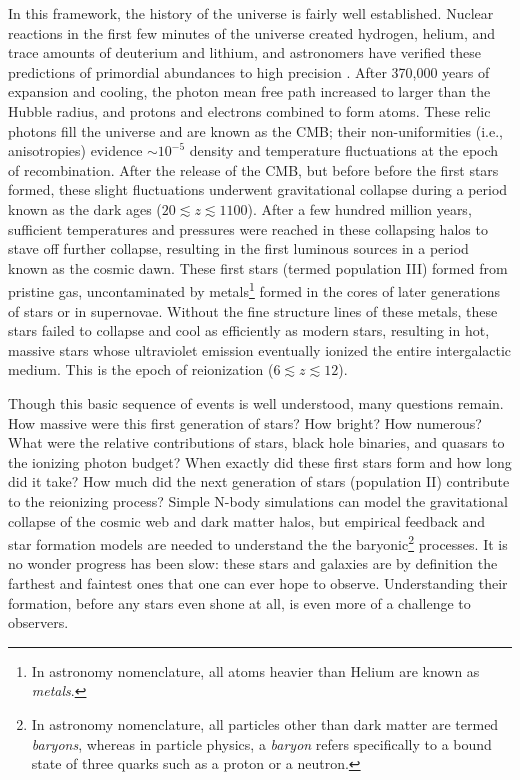 In this framework, the history of the universe is fairly well established. Nuclear reactions in the first few minutes of the universe created hydrogen, helium, and trace amounts of deuterium and lithium, and astronomers have verified these predictions of primordial abundances to high precision \citep{bbn}. After 370,000 years of expansion and cooling, the photon mean free path increased to larger than the Hubble radius, and protons and electrons combined to form atoms. These relic photons fill the universe and are known as the CMB; their non-uniformities (i.e., anisotropies) evidence $\sim10^{-5}$ density and temperature fluctuations at the epoch of recombination. After the release of the CMB, but before before the first stars formed, these slight fluctuations underwent gravitational collapse during a period known as the dark ages ($20\lesssim z\lesssim 1100$). After a few hundred million years, sufficient temperatures and pressures were reached in these collapsing halos to stave off further collapse, resulting in the first luminous sources in a period known as the cosmic dawn. These first stars (termed population III) formed from pristine gas, uncontaminated by metals\footnote{In astronomy nomenclature, all atoms heavier than Helium are known as \textit{metals}.} formed in the cores of later generations of stars or in supernovae. Without the fine structure lines of these metals, these stars failed to collapse and cool as efficiently as modern stars, resulting in hot, massive stars whose ultraviolet emission eventually ionized the entire intergalactic medium. This is the epoch of reionization ($6\lesssim z\lesssim12$).

Though this basic sequence of events is well understood, many questions remain. How massive were this first generation of stars? How bright? How numerous? What were the relative contributions of stars, black hole binaries, and quasars to the ionizing photon budget? When exactly did these first stars form and how long did it take? How much did the next generation of stars (population II) contribute to the reionizing process? Simple N-body simulations can model the gravitational collapse of the cosmic web and dark matter halos, but empirical feedback and star formation models are needed to understand the the baryonic\footnote{In astronomy nomenclature, all particles other than dark matter are termed \textit{baryons}, whereas in particle physics, a \textit{baryon} refers specifically to a bound state of three quarks such as a proton or a neutron.} processes. It is no wonder progress has been slow: these stars and galaxies are by definition the farthest and faintest ones that one can ever hope to observe. Understanding their formation, before any stars even shone at all, is even more of a challenge to observers. 

